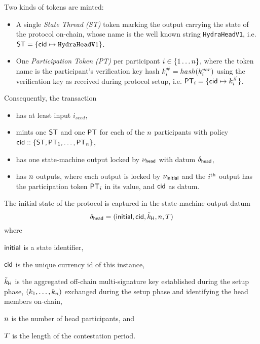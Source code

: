 \vspace{0.1cm}
\noindent Two kinds of tokens are minted:
\begin{itemize}
  \item A single \emph{State Thread (ST)} token marking the output carrying the state
        of the protocol on-chain, whose name is the well known string
        \texttt{HydraHeadV1}, i.e.
        $\mathsf{ST} = \{\mathsf{cid} \mapsto \texttt{HydraHeadV1}\}$.
  \item One \emph{Participation Token (PT)} per participant
        $i \in \{1 \dots n \}$, where the token name is the participant's
        verification key hash $k^{\#}_{i} = hash(k^{ver}_{i})$ using the
        verification key as received during protocol setup, i.e.
        $\mathsf{PT}_{i} = \{\mathsf{cid} \mapsto k^{\#}_{i}\}$.
\end{itemize}

\noindent Consequently, the \mtxInit{} transaction

\begin{itemize}
  \item has at least input $i_{seed}$,
  \item mints one $\mathsf{ST}$ and one $\mathsf{PT}$ for each of the $n$ participants with
        policy $\mathsf{cid} :: \{\mathsf{ST}, \mathsf{PT}_{1}, \ldots, \mathsf{PT}_{n}\}$,
  \item has one state-machine output locked by $\nu_\mathsf{head}$ with datum
        $\delta_{\mathsf{head}}$,
  \item has $n$ outputs, where each output is locked by $\nu_\mathsf{initial}$ and the
        $i^{\text{th}}$ output has the participation token $\mathsf{PT}_i$ in its value, and
        $\mathsf{cid}$ as datum.
\end{itemize}

\noindent The initial state of the protocol is captured in the state-machine output datum
\[
  \delta_{\mathsf{head}} = (\mathsf{initial},\mathsf{cid},\tilde{k}_{\mathsf{H}},n,T)
\]
where
\begin{mitemize}
  \item $\mathsf{initial}$ is a state identifier,
  \item $\mathsf{cid}$ is the unique currency id of this instance,
  \item $\tilde{k}_{\mathsf{H}}$ is the aggregated off-chain multi-signature key established during the
  setup phase,
  $(k_1,\ldots,k_n)$ exchanged during the setup phase and identifying the
  head members on-chain,
  \item $n$ is the number of head participants, and
  \item $T$ is the length of the contestation period.
\end{mitemize}

